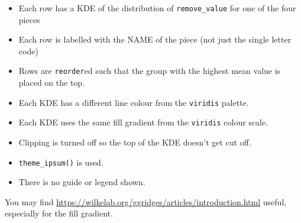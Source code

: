 \documentclass[
]{article}
\providecommand{\tightlist}{%
  \setlength{\itemsep}{0pt}\setlength{\parskip}{0pt}}
\begin{document}
\begin{itemize}
\tightlist
\item
  Each row has a KDE of the distribution of \texttt{remove\_value} for
  one of the four pieces
\item
  Each row is labelled with the NAME of the piece (not just the single
  letter code)
\item
  Rows are \texttt{reorder}ed such that the group with the highest mean
  value is placed on the top.
\item
  Each KDE has a different line colour from the \texttt{viridis}
  palette.
\item
  Each KDE uses the same fill gradient from the \texttt{viridis} colour
  scale.
\item
  Clipping is turned off so the top of the KDE doesn't get cut off.
\item
  \texttt{theme\_ipsum()} is used.
\item
  There is no guide or legend shown.
\end{itemize}

You may find
\url{https://wilkelab.org/ggridges/articles/introduction.html} useful,
especially for the fill gradient.
\end{document}
